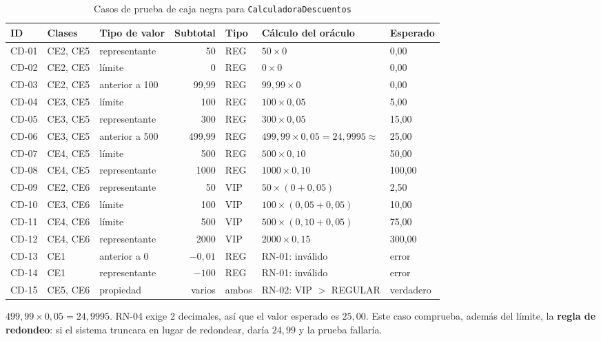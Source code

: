 \documentclass[11pt,a4paper,oneside]{report}
\newcommand{\code}[1]{\texttt{#1}}
\begin{document}
\begin{table}[H]
\centering
\caption{Casos de prueba de caja negra para \code{CalculadoraDescuentos}}
\small
\begin{tabular}{lllrlll}
\toprule
\textbf{ID} & \textbf{Clases} & \textbf{Tipo de valor} & \textbf{Subtotal} & \textbf{Tipo} & \textbf{Cálculo del oráculo} & \textbf{Esperado}\\
\midrule
CD-01 & CE2, CE5 & representante & 50 & REG & $50 \times 0$ & 0,00\\
CD-02 & CE2, CE5 & límite & 0 & REG & $0 \times 0$ & 0,00\\
CD-03 & CE2, CE5 & anterior a 100 & 99,99 & REG & $99{,}99 \times 0$ & 0,00\\
CD-04 & CE3, CE5 & límite & 100 & REG & $100 \times 0{,}05$ & 5,00\\
CD-05 & CE3, CE5 & representante & 300 & REG & $300 \times 0{,}05$ & 15,00\\
CD-06 & CE3, CE5 & anterior a 500 & 499,99 & REG & $499{,}99 \times 0{,}05 = 24{,}9995 \approx$ & 25,00\\
CD-07 & CE4, CE5 & límite & 500 & REG & $500 \times 0{,}10$ & 50,00\\
CD-08 & CE4, CE5 & representante & 1000 & REG & $1000 \times 0{,}10$ & 100,00\\
CD-09 & CE2, CE6 & representante & 50 & VIP & $50 \times (0 + 0{,}05)$ & 2,50\\
CD-10 & CE3, CE6 & límite & 100 & VIP & $100 \times (0{,}05 + 0{,}05)$ & 10,00\\
CD-11 & CE4, CE6 & límite & 500 & VIP & $500 \times (0{,}10 + 0{,}05)$ & 75,00\\
CD-12 & CE4, CE6 & representante & 2000 & VIP & $2000 \times 0{,}15$ & 300,00\\
CD-13 & CE1 & anterior a 0 & $-0{,}01$ & REG & RN-01: inválido & error\\
CD-14 & CE1 & representante & $-100$ & REG & RN-01: inválido & error\\
CD-15 & CE5, CE6 & propiedad & varios & ambos & RN-02: VIP $>$ REGULAR & verdadero\\
\bottomrule
\end{tabular}
\end{table}

\begin{nota}
$499{,}99 \times 0{,}05 = 24{,}9995$. RN-04 exige 2 decimales, así que el valor esperado es $25{,}00$. Este caso comprueba, además del límite, la \textbf{regla de redondeo}: si el sistema truncara en lugar de redondear, daría $24{,}99$ y la prueba fallaría.
\end{nota}
\end{document}
